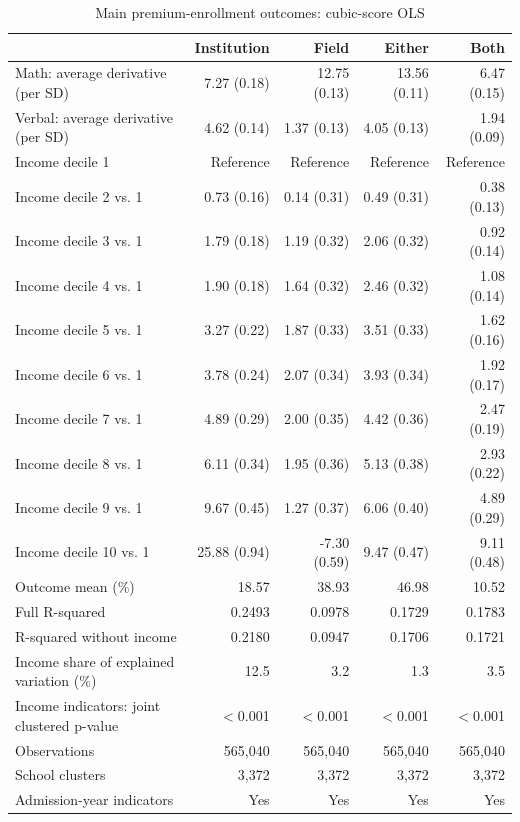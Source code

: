 \begin{table}[!htbp]\centering
\caption{Main premium-enrollment outcomes: cubic-score OLS}
\label{tab:premium-cubic-income-main}
\small
\begin{tabular}{lrrrr}\hline\hline
 & Institution & Field & Either & Both \\ \hline
Math: average derivative (per SD) & 7.27 (0.18) & 12.75 (0.13) & 13.56 (0.11) & 6.47 (0.15) \\
Verbal: average derivative (per SD) & 4.62 (0.14) & 1.37 (0.13) & 4.05 (0.13) & 1.94 (0.09) \\
Income decile 1 & Reference & Reference & Reference & Reference \\
Income decile 2 vs. 1 & 0.73 (0.16) & 0.14 (0.31) & 0.49 (0.31) & 0.38 (0.13) \\
Income decile 3 vs. 1 & 1.79 (0.18) & 1.19 (0.32) & 2.06 (0.32) & 0.92 (0.14) \\
Income decile 4 vs. 1 & 1.90 (0.18) & 1.64 (0.32) & 2.46 (0.32) & 1.08 (0.14) \\
Income decile 5 vs. 1 & 3.27 (0.22) & 1.87 (0.33) & 3.51 (0.33) & 1.62 (0.16) \\
Income decile 6 vs. 1 & 3.78 (0.24) & 2.07 (0.34) & 3.93 (0.34) & 1.92 (0.17) \\
Income decile 7 vs. 1 & 4.89 (0.29) & 2.00 (0.35) & 4.42 (0.36) & 2.47 (0.19) \\
Income decile 8 vs. 1 & 6.11 (0.34) & 1.95 (0.36) & 5.13 (0.38) & 2.93 (0.22) \\
Income decile 9 vs. 1 & 9.67 (0.45) & 1.27 (0.37) & 6.06 (0.40) & 4.89 (0.29) \\
Income decile 10 vs. 1 & 25.88 (0.94) & -7.30 (0.59) & 9.47 (0.47) & 9.11 (0.48) \\
\hline
Outcome mean (\%) & 18.57 & 38.93 & 46.98 & 10.52 \\
Full R-squared & 0.2493 & 0.0978 & 0.1729 & 0.1783 \\
R-squared without income & 0.2180 & 0.0947 & 0.1706 & 0.1721 \\
Income share of explained variation (\%) & 12.5 & 3.2 & 1.3 & 3.5 \\
Income indicators: joint clustered p-value & $<$0.001 & $<$0.001 & $<$0.001 & $<$0.001 \\
Observations & 565,040 & 565,040 & 565,040 & 565,040 \\
School clusters & 3,372 & 3,372 & 3,372 & 3,372 \\
Admission-year indicators & Yes & Yes & Yes & Yes \\

\end{tabular}
\end{table}
